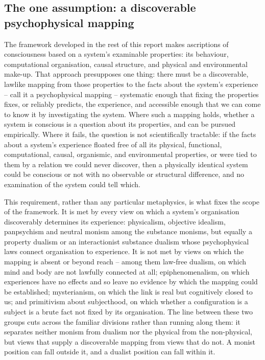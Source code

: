 \documentclass[11pt, a4paper, onecolumn, gdm]{google}
\begin{document}
\subsection{The one assumption: a discoverable psychophysical mapping}\label{the-one-assumption-a-discoverable-psychophysical-mapping}

The framework developed in the rest of this report makes ascriptions of consciousness based on a system's examinable properties: its behaviour, computational organisation, causal structure, and physical and environmental make-up.
That approach presupposes one thing: there must be a discoverable, lawlike mapping from those properties to the facts about the system's experience -- call it a psychophysical mapping -- systematic enough that fixing the properties fixes, or reliably predicts, the experience, and accessible enough that we can come to know it by investigating the system.
Where such a mapping holds, whether a system is conscious is a question about its properties, and can be pursued empirically.
Where it fails, the question is not scientifically tractable: if the facts about a system's experience floated free of all its physical, functional, computational, causal, organismic, and environmental properties, or were tied to them by a relation we could never discover, then a physically identical system could be conscious or not with no observable or structural difference, and no examination of the system could tell which.

This requirement, rather than any particular metaphysics, is what fixes the scope of the framework.
It is met by every view on which a system's organisation discoverably determines its experience: physicalism, objective idealism, panpsychism and neutral monism among the substance monisms, but equally a property dualism or an interactionist substance dualism whose psychophysical laws connect organisation to experience.
It is not met by views on which the mapping is absent or beyond reach -- among them law-free dualism, on which mind and body are not lawfully connected at all; epiphenomenalism, on which experiences have no effects and so leave no evidence by which the mapping could be established; mysterianism, on which the link is real but cognitively closed to us; and primitivism about subjecthood, on which whether a configuration is a subject is a brute fact not fixed by its organisation.
The line between these two groups cuts across the familiar divisions rather than running along them: it separates neither monism from dualism nor the physical from the non-physical, but views that supply a discoverable mapping from views that do not.
A monist position can fall outside it, and a dualist position can fall within it.
\end{document}
